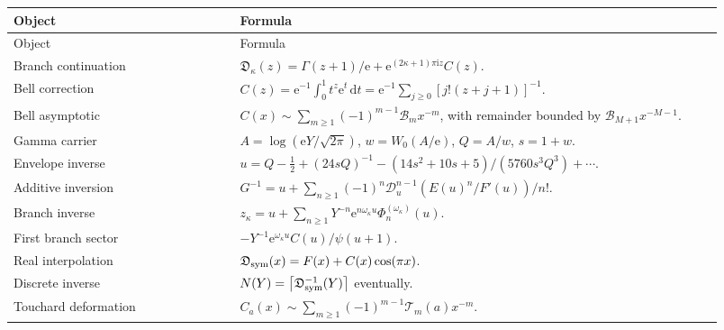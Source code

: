 \documentclass[11pt]{article}
\numberwithin{equation}{section}
\theoremstyle{mainthm}
\theoremstyle{defstyle}
\theoremstyle{remark}
\newcommand{\e}{\mathrm e}
\newcommand{\ii}{\mathrm i}
\newcommand{\dd}{\,\mathrm d}
\newcommand{\Dsub}{\mathfrak D}
\newcommand{\Bell}{\mathcal B}
\newcommand{\Touch}{\mathcal T}
\newcommand{\ceil}[1]{\left\lceil #1\right\rceil}
\begin{document}
\begin{longtable}{p{0.30\linewidth} p{0.64\linewidth}}
\toprule
Object & Formula\\
\midrule
\endfirsthead
\toprule
Object & Formula\\
\midrule
\endhead
Branch continuation
& \(\Dsub_\kappa(z)=\Gamma(z+1)/\e+\e^{(2\kappa+1)\pi\ii z}C(z)\).\\[0.4em]
Bell correction
& \(C(z)=\e^{-1}\int_0^1t^z\e^t\dd t=\e^{-1}\sum_{j\ge0}[j!(z+j+1)]^{-1}\).\\[0.4em]
Bell asymptotic
& \(C(x)\sim\sum_{m\ge1}(-1)^{m-1}\Bell_mx^{-m}\), with remainder bounded by \(\Bell_{M+1}x^{-M-1}\).\\[0.4em]
Gamma carrier
& \(A=\log(\e Y/\sqrt{2\pi})\), \(w=W_0(A/\e)\), \(Q=A/w\), \(s=1+w\).\\[0.4em]
Envelope inverse
& \(u=Q-\tfrac12+(24sQ)^{-1}-(14s^2+10s+5)/(5760s^3Q^3)+\cdots\).\\[0.4em]
Additive inversion
& \(G^{-1}=u+\sum_{n\ge1}(-1)^n\mathscr D_u^{n-1}(E(u)^n/F'(u))/n!\).\\[0.4em]
Branch inverse
& \(z_\kappa=u+\sum_{n\ge1}Y^{-n}\e^{n\omega_\kappa u}\Phi_n^{(\omega_\kappa)}(u)\).\\[0.4em]
First branch sector
& \(-Y^{-1}\e^{\omega_\kappa u}C(u)/\psi(u+1)\).\\[0.4em]
Real interpolation
& \(\Dsub_{\rm sym}(x)=F(x)+C(x)\cos(\pi x)\).\\[0.4em]
Discrete inverse
& \(N(Y)=\ceil{\Dsub_{\rm sym}^{-1}(Y)}\) eventually.\\[0.4em]
Touchard deformation
& \(C_a(x)\sim\sum_{m\ge1}(-1)^{m-1}\Touch_m(a)x^{-m}\).\\
\bottomrule
\end{longtable}
\end{document}
